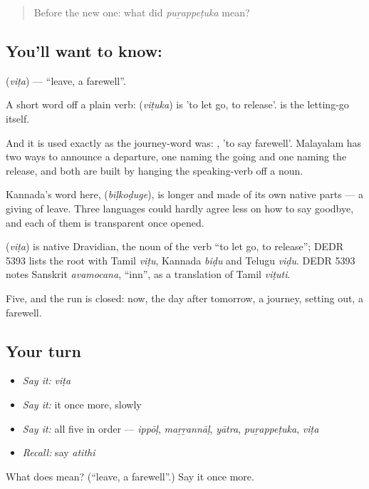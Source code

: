 \label{lesson:ML-C50-farewell}



\begin{quote}
Before the new one: what did \emph{puṟappeṭuka} mean?
\end{quote}

\subsection*{You'll want to know: }
\textbf{} (\emph{viṭa}) — \textquotedblleft{}leave, a farewell\textquotedblright{}.

A short word off a plain verb:  (\emph{viṭuka}) is 'to let go, to release'.  is the letting-go itself.

And it is used exactly as the journey-word was:  , 'to say farewell'. Malayalam has two ways to announce a departure, one naming the going and one naming the release, and both are built by hanging the speaking-verb off a noun.

Kannada's word here,  (\emph{bīḷkoḍuge}), is longer and made of its own native parts — a giving of leave. Three languages could hardly agree less on how to say goodbye, and each of them is transparent once opened.

\begin{cousinweb}
\textbf{} (\emph{viṭa}) is native Dravidian, the noun of the verb \textquotedblleft{}to let go, to release\textquotedblright{}; DEDR 5393 lists the root with Tamil \emph{viṭu}, Kannada \emph{biḍu} and Telugu \emph{viḍu}. DEDR 5393 notes Sanskrit \emph{avamocana}, \textquotedblleft{}inn\textquotedblright{}, as a translation of Tamil \emph{viṭuti}.
\end{cousinweb}

\begin{grammarlens}[title={What you've built}]
Five, and the run is closed: now, the day after tomorrow, a journey, setting out, a farewell.
\end{grammarlens}

\subsection*{Your turn}
\begin{itemize}
\raggedright
  \item \emph{Say it:} \emph{viṭa}
  \item \emph{Say it:} it once more, slowly
  \item \emph{Say it:} all five in order — \emph{ippōḷ}, \emph{maṟṟannāḷ}, \emph{yātra}, \emph{puṟappeṭuka}, \emph{viṭa}
  \item \emph{Recall:} say \emph{atithi}
\end{itemize}

\begin{tcolorbox}[breakable,colback=teal!4,colframe=teal!35!black,title={Before you move on}]
What does  mean? (\textquotedblleft{}leave, a farewell\textquotedblright{}.) Say it once more.
\end{tcolorbox}
